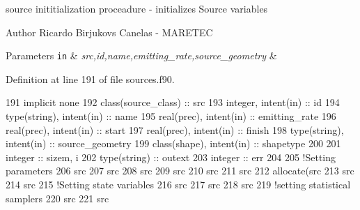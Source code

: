 source inititialization proceadure -\/ initializes Source variables 

\begin{DoxyAuthor}{Author}
Ricardo Birjukovs Canelas -\/ M\+A\+R\+E\+T\+EC
\end{DoxyAuthor}

\begin{DoxyParams}[1]{Parameters}
\mbox{\tt in}  & {\em src,id,name,emitting\+\_\+rate,source\+\_\+geometry} & \\
\hline
\end{DoxyParams}


Definition at line 191 of file sources.\+f90.


\begin{DoxyCode}
191     \textcolor{keywordtype}{implicit none}
192     \textcolor{keywordtype}{class}(source\_class) :: src
193     \textcolor{keywordtype}{integer}, \textcolor{keywordtype}{intent(in)} :: id
194     \textcolor{keywordtype}{type}(string), \textcolor{keywordtype}{intent(in)} :: name
195     \textcolor{keywordtype}{real(prec)}, \textcolor{keywordtype}{intent(in)} :: emitting\_rate
196     \textcolor{keywordtype}{real(prec)}, \textcolor{keywordtype}{intent(in)} :: start
197     \textcolor{keywordtype}{real(prec)}, \textcolor{keywordtype}{intent(in)} :: finish
198     \textcolor{keywordtype}{type}(string), \textcolor{keywordtype}{intent(in)} :: source\_geometry
199     \textcolor{keywordtype}{class}(shape), \textcolor{keywordtype}{intent(in)} :: shapetype
200 
201     \textcolor{keywordtype}{integer} :: sizem, i
202     \textcolor{keywordtype}{type}(string) :: outext
203     \textcolor{keywordtype}{integer} :: err
204 
205     \textcolor{comment}{!Setting parameters}
206     src%
207     src%
208     src%
209     src%
210     src%
211     src%
212     \textcolor{keyword}{allocate}(src%
213     src%
214     src%
215     \textcolor{comment}{!Setting state variables}
216     src%
217     src%
218     src%
219     \textcolor{comment}{!setting statistical samplers}
220     src%
221     src%

\end{DoxyCode}
